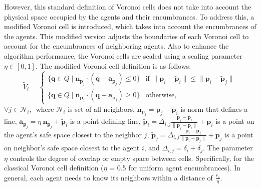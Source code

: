         However, this standard definition of Voronoi cells does not take into account the physical space occupied by the agents and their encumbrances. 
        To address this, a modified Voronoi cell is introduced, which takes into account the encumbrances of the agents.
        This modified version adjusts the boundaries of each Voronoi cell to account for the encumbrances of neighboring agents.
        Also to enhance the algorithm performance, the Voronoi cells are scaled using a scaling parameter $\eta \in [0, 1]$.
        The modified Voronoi cell definition is as follows:
        \begin{equation}
            \label{eqn:voronoi_cell_account_encum}
            \tilde{V}_i = 
            \begin{cases}
                \{ \mathbf{q} \in Q \mid \mathbf{n}_{\mathbf{p}_j} \cdot (\mathbf{q} - \mathbf{a}_{\mathbf{p}_j}) \leq 0 \} & \text{if } \| \mathbf{p}_{i} - \tilde{\mathbf{p}}_{i} \| \leq \| \mathbf{p}_{i} - \tilde{\mathbf{p}}_{j} \| \\
                \{ \mathbf{q} \in Q \mid \mathbf{n}_{\mathbf{p}_j} \cdot (\mathbf{q} - \mathbf{a}_{\mathbf{p}_j}) \geq 0 \} & \text{otherwise,}
            \end{cases}
        \end{equation}
        $\forall j \in \mathcal{N}_i \text{, }$
        where $\mathcal{N}_i$ is set of all neighbors, $\mathbf{n}_{\mathbf{p}_j} = \tilde{\mathbf{p}}_{j} - \tilde{\mathbf{p}}_{i}$ is norm that defines a line, 
        $\mathbf{a}_{\mathbf{p}_{j}} = \eta \ \mathbf{n}_{\mathbf{p}_j} + \tilde{\mathbf{p}}_{i}$ is a point defining line,
        $\tilde{\mathbf{p}}_{i} = \Delta_{i,j}\frac{\mathbf{p}_{j} - \mathbf{p}_{i}}{\| \mathbf{p}_{j} - \mathbf{p}_{i} \|} + \mathbf{p}_i$ is a point on the agent's safe space closest to the neighbor $j$,
        $\tilde{\mathbf{p}}_{j} = \Delta_{i,j}\frac{\mathbf{p}_{i} - \mathbf{p}_{j}}{\| \mathbf{p}_{i} - \mathbf{p}_{j} \|} + \mathbf{p}_{j}$ is a point on neighbor's safe space closest to the agent $i$,
        and $\Delta_{i,j} = \delta_{i} + \delta_{j}$.
        The parameter $\eta$ controls the degree of overlap or empty space between cells.
        Specifically, for the classical Voronoi cell definition ($\eta$ = 0.5 for uniform agent encumbrances).%
        In general, each agent needs to know its neighbors within a distance of $\frac{r_s}{\eta}$.


